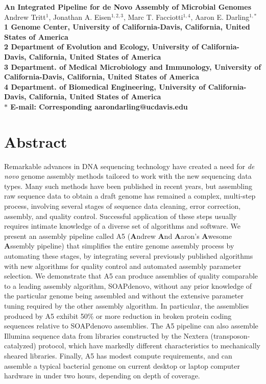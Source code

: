 \documentclass[10pt]{article}
\date{}
\begin{document}
\begin{flushleft}
{\Large
\textbf{An Integrated Pipeline for de Novo Assembly of Microbial Genomes}
}
\\
Andrew Tritt$^{1}$, 
Jonathan A. Eisen$^{1,2,3}$, 
Marc T. Facciotti$^{1,4}$, 
Aaron E. Darling$^{1,\ast}$
\\
\bf{1} Genome Center, University of California-Davis, California, United States of America
\\
\bf{2} Department of Evolution and Ecology, University of California-Davis, California, United States of America
\\
\bf{3} Department. of Medical Microbiology and Immunology, University of California-Davis, California, United States of America
\\
\bf{4} Department. of Biomedical Engineering, University of California-Davis, California, United States of America
\\
$\ast$ E-mail: Corresponding aarondarling@ucdavis.edu
\end{flushleft}

\section*{Abstract}
Remarkable advances in DNA sequencing technology have created a need for \textit{de novo} genome assembly methods
tailored to work with the new sequencing data types. Many such methods have been published in recent years, but assembling
raw sequence data to obtain a draft genome has remained a complex, multi-step process, 
involving several stages of sequence data cleaning, error correction, assembly, and quality control. 
Successful application of these steps usually requires intimate knowledge of a diverse set of algorithms and software. 
We present an assembly pipeline called A5 (\textbf{A}ndrew \textbf{A}nd \textbf{A}aron's \textbf{A}wesome \textbf{A}ssembly pipeline) that simplifies the entire genome assembly process by automating these stages, by
integrating several previously published algorithms with new algorithms for quality control and automated assembly parameter selection.
We demonstrate that A5 can produce assemblies of quality comparable to a leading assembly algorithm, SOAPdenovo, without
any prior knowledge of the particular genome being assembled and without the extensive parameter tuning required
by the other assembly algorithm. 
In particular, the assemblies produced by A5 exhibit 50\% or more reduction in broken protein coding sequences relative to SOAPdenovo assemblies.
The A5 pipeline can also assemble Illumina sequence data from libraries constructed by the Nextera
(transposon-catalyzed) protocol, which have markedly different characteristics to mechanically sheared libraries.
Finally, A5 has modest compute requirements, and can assemble a typical bacterial genome on current desktop or laptop computer hardware in under two hours, depending on depth of coverage.
\end{document}
